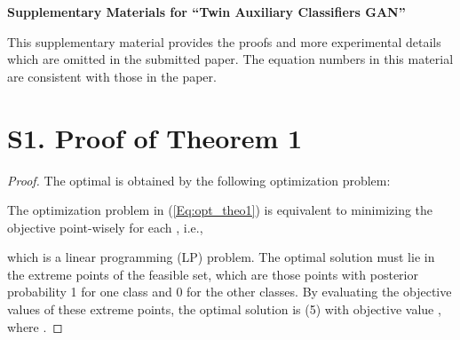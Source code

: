 
















\newpage
\begin{center}
    \Large\textbf{Supplementary Materials for ``Twin Auxiliary Classifiers GAN''}\\
\end{center}
{\large This supplementary material provides the
 proofs and more experimental details which are omitted in the submitted paper. The equation
 numbers in this material are consistent with those in the paper.}
 










\section*{S1. Proof of Theorem 1}
\begin{proof}
The optimal  is obtained by the following optimization problem:

The optimization problem in (\ref{Eq:opt_theo1}) is equivalent to minimizing the objective point-wisely for each , i.e., 

which is a linear programming (LP) problem. The optimal solution must lie in the extreme points of the feasible set, which are those points with posterior probability 1 for one class and 0 for the other classes. By evaluating the objective values of these extreme points, the optimal solution is  (5) with objective value , where .
\end{proof}

